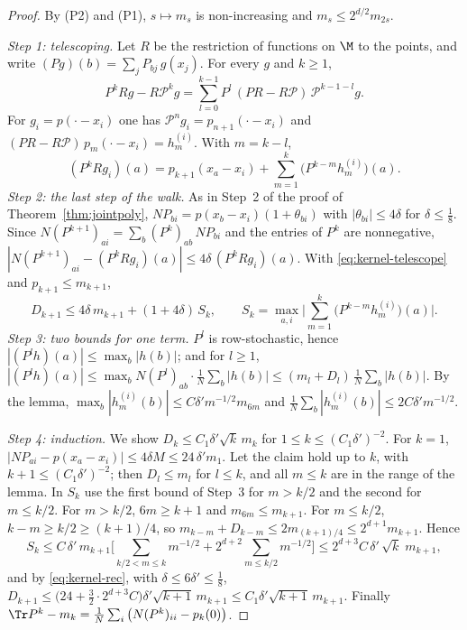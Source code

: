 \begin{proof}
By (P2) and (P1), $s\mapsto m_s$ is non-increasing and $m_s\le2^{d/2}m_{2s}$.

\emph{Step 1: telescoping.} Let $R$ be the restriction of functions on $\M$ to the points, and write $(Pg)(b)=\sum_jP_{bj}\,g(x_j)$. For every $g$ and $k\ge1$,
\[
P^kRg-R\mathcal P^kg=\sum_{l=0}^{k-1}P^l\,(PR-R\mathcal P)\,\mathcal P^{k-1-l}g .
\]
For $g_i=p(\cdot-x_i)$ one has $\mathcal P^ng_i=p_{n+1}(\cdot-x_i)$ and $(PR-R\mathcal P)\,p_m(\cdot-x_i)=h^{(i)}_m$. With $m=k-l$,
\begin{equation}\label{eq:kernel-telescope}
(P^kRg_i)(a)=p_{k+1}(x_a-x_i)+\sum_{m=1}^k\big(P^{k-m}h^{(i)}_m\big)(a).
\end{equation}
\emph{Step 2: the last step of the walk.} As in Step~2 of the proof of Theorem~\ref{thm:jointpoly}, $NP_{bi}=p(x_b-x_i)(1+\theta_{bi})$ with $|\theta_{bi}|\le4\delta$ for $\delta\le\frac18$. Since $N(P^{k+1})_{ai}=\sum_b(P^k)_{ab}\,NP_{bi}$ and the entries of $P^k$ are nonnegative, $|N(P^{k+1})_{ai}-(P^kRg_i)(a)|\le4\delta\,(P^kRg_i)(a)$. With \eqref{eq:kernel-telescope} and $p_{k+1}\le m_{k+1}$,
\begin{equation}\label{eq:kernel-rec}
D_{k+1}\le4\delta\,m_{k+1}+(1+4\delta)\,S_k,\qquad S_k=\max_{a,i}\Big|\sum_{m=1}^k\big(P^{k-m}h^{(i)}_m\big)(a)\Big| .
\end{equation}
\emph{Step 3: two bounds for one term.} $P^l$ is row-stochastic, hence $|(P^lh)(a)|\le\max_b|h(b)|$; and for $l\ge1$, $|(P^lh)(a)|\le\max_bN(P^l)_{ab}\cdot\frac1N\sum_b|h(b)|\le(m_l+D_l)\,\frac1N\sum_b|h(b)|$. By the lemma, $\max_b|h^{(i)}_m(b)|\le C\delta'm^{-1/2}m_{6m}$ and $\frac1N\sum_b|h^{(i)}_m(b)|\le2C\delta'm^{-1/2}$.

\emph{Step 4: induction.} We show $D_k\le C_1\delta'\sqrt k\,m_k$ for $1\le k\le(C_1\delta')^{-2}$. For $k=1$, $|NP_{ai}-p(x_a-x_i)|\le4\delta M\le24\,\delta'm_1$. Let the claim hold up to $k$, with $k+1\le(C_1\delta')^{-2}$; then $D_l\le m_l$ for $l\le k$, and all $m\le k$ are in the range of the lemma. In $S_k$ use the first bound of Step~3 for $m>k/2$ and the second for $m\le k/2$. For $m>k/2$, $6m\ge k+1$ and $m_{6m}\le m_{k+1}$. For $m\le k/2$, $k-m\ge k/2\ge(k+1)/4$, so $m_{k-m}+D_{k-m}\le2m_{(k+1)/4}\le2^{d+1}m_{k+1}$. Hence
\[
S_k\le C\,\delta'\,m_{k+1}\Big[\sum_{k/2<m\le k}m^{-1/2}+2^{d+2}\sum_{m\le k/2}m^{-1/2}\Big]\le2^{d+3}C\,\delta'\,\sqrt k\;m_{k+1},
\]
and by \eqref{eq:kernel-rec}, with $\delta\le6\delta'\le\frac18$, $D_{k+1}\le\big(24+\tfrac32\cdot2^{d+3}C\big)\delta'\sqrt{k+1}\,m_{k+1}\le C_1\delta'\sqrt{k+1}\,m_{k+1}$. Finally $\Tr P^k-m_k=\frac1N\sum_i\big(N(P^k)_{ii}-p_k(0)\big)$.
\end{proof}

